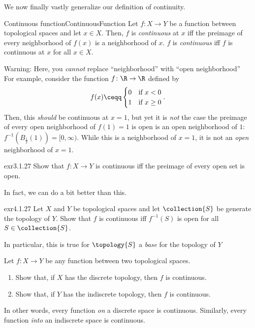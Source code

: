 We now finally vastly generalize our definition of continuity.
\begin{dfn}{Continuous function}{ContinuousFunction}
Let $f\colon X\rightarrow Y$ be a function between topological spaces and let $x\in X$.  Then, $f$ is \emph{continuous} at $x$ iff the preimage of every neighborhood of $f(x)$ is a neighborhood of $x$.  $f$ is \emph{continuous} iff $f$ is continuous at $x$ for all $x\in X$.
\begin{wrn}
Warning:  Here, you \emph{cannot} replace ``neighborhood'' with ``open neighborhood''  For example, consider the function $f\colon \R \rightarrow \R$ defined by
\begin{equation}
f(x)\ceqq \begin{cases}0 & \text{if }x<0 \\ 1 & \text{if }x\geq 0\end{cases}.
\end{equation}
Then, this \emph{should} be continuous at $x=1$, but yet it is \emph{not} the case the preimage of every open neighborhood of $f(1)=1$ is open is an open neighborhood of $1$:  $f^{-1}(B_{\frac{1}{2}}(1))=[0,\infty )$.  While this is a neighborhood of $x=1$, it is not an \emph{open} neighborhood of $x=1$.
\end{wrn}
\end{dfn}
\begin{exr}{}{exr3.1.27}
Show that $f\colon X\rightarrow Y$ is continuous iff the preimage of every open set is open.
\end{exr}
In fact, we can do a bit better than this.
\begin{exr}{}{exr4.1.27}
Let $X$ and $Y$ be topological spaces and let $\collection{S}$ be generate the topology of $Y$.  Show that $f$ is continuous iff $f^{-1}(S)$ is open for all $S\in \collection{S}$.
\begin{rmk}
In particular, this is true for $\topology{S}$ a \emph{base} for the topology of $Y$
\end{rmk}
\end{exr}
\begin{exr}{}{}
Let $f\colon X\rightarrow Y$ be any function between two topological spaces.
\begin{enumerate}
\item Show that, if $X$ has the discrete topology, then $f$ is continuous.
\item Show that, if $Y$ has the indiscrete topology, then $f$ is continuous.
\end{enumerate}
\begin{rmk}
In other words, every function \emph{on} a discrete space is continuous.  Similarly, every function \emph{into} an indiscrete space is continuous.
\end{rmk}
\end{exr}


